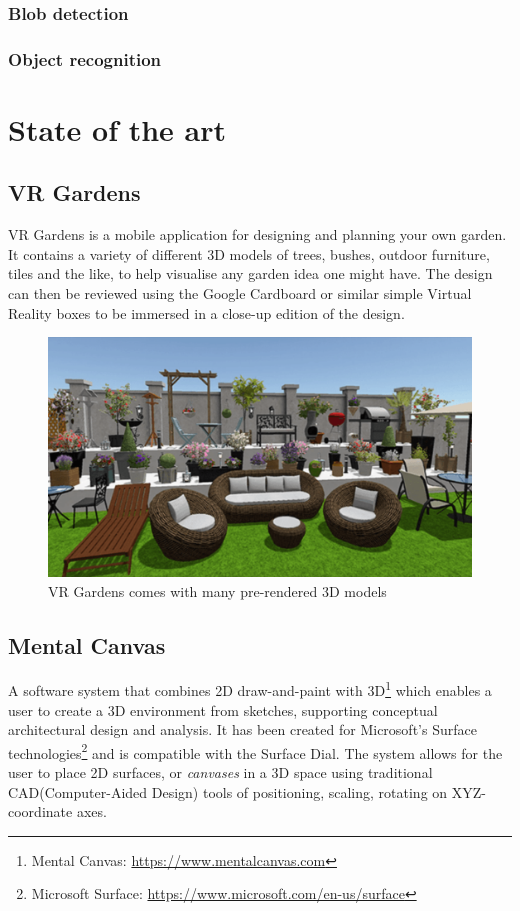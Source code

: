 			\subsubsection{Blob detection}
			
			\subsubsection{Object recognition}

    \section{State of the art}\label{sec:SOTA}
		
		\subsection{VR Gardens}
			VR Gardens is a mobile application for designing and planning your own garden. It contains a variety of different 3D models of trees, bushes, outdoor furniture, tiles and the like, to help visualise any garden idea one might have. The design can then be reviewed using the Google Cardboard or similar simple Virtual Reality boxes to be immersed in a close-up edition of the design.
			\begin{figure}[H]
				\centering
				\includegraphics[width=0.6\linewidth]{figure/Analysis/vrgardens}
				\caption{VR Gardens comes with many pre-rendered 3D models}
				\label{fig:vrgardens}
			\end{figure}
			
		\subsection{Mental Canvas}
			A software system that combines 2D draw-and-paint with 3D\footnote{Mental Canvas: \url{https://www.mentalcanvas.com}} which enables a user to create a 3D environment from sketches, supporting conceptual architectural design and analysis. It has been created for Microsoft's Surface technologies\footnote{Microsoft Surface: \url{https://www.microsoft.com/en-us/surface}} and is compatible with the Surface Dial. The system allows for the user to place 2D surfaces, or \textit{canvases} in a 3D space using traditional CAD(Computer-Aided Design) tools of positioning, scaling, rotating on XYZ-coordinate axes.\cite{sotaMentalCanvas}
			
